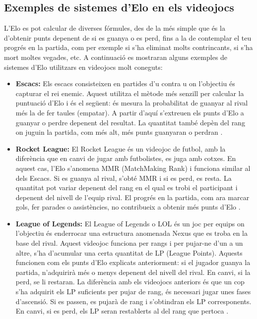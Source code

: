 \documentclass[a4paper]{article}
\begin{document}
\newpage
\subsection{Exemples de sistemes d'Elo en els videojocs}
L'Elo es pot calcular de diverses fórmules, des de la més simple que és la d'obtenir punts depenent de si es guanya o es perd, fins a la de contemplar el teu progrés en la partida, com per exemple si s'ha eliminat molts contrincants, si s'ha mort moltes vegades, etc. A continuació es mostraran alguns exemples de sistemes d'Elo utilitzars en videojocs molt coneguts:

\begin{itemize}
    \item \textbf{Escacs:} Els escacs consisteixen en partides d'u contra u on l'objectiu és capturar el rei enemic. Aquest utilitza el mètode més senzill per calcular la puntuació d'Elo i és el següent: és mesura la probabilitat de guanyar al rival més la de fer taules (empatar). A partir d'aquí s'extreuen els punts d'Elo a guanyar o perdre depenent del resultat. La quantitat també depèn del rang on juguin la partida, com més alt, més punts guanyaran o perdran \cite{wikipediaElo}.
    \item \textbf{Rocket League:} El Rocket League és un videojoc de futbol, amb la diferència que en canvi de jugar amb futbolistes, es juga amb cotxes. En aquest cas, l'Elo s'anomena MMR (MatchMaking Rank) i funciona similar al dels Escacs. Si es guanya al rival, s'obté MMR i si es perd, es resta. La quantitat pot variar depenent del rang en el qual es trobi el participant i depenent del nivell de l'equip rival. El progrés en la partida, com ara marcar gols, fer parades o assistències, no contribueix a obtenir més punts d'Elo \cite{rocketElo}.
    \item \textbf{League of Legends:} El League of Legends o LOL és un joc per equips on l'objectiu és enderrocar una estructura anomenada Nexus que es troba en la base del rival. Aquest videojoc funciona per rangs i per pujar-ne d'un a un altre, s'ha d'acumular una certa quantitat de LP (League Points). Aquests funcionen com els punts d'Elo explicats anteriorment: si el jugador guanya la partida, n'adquirirà més o menys depenent del nivell del rival. En canvi, si la perd, se li restaran. La diferència amb els videojocs anteriors és que un cop s'ha adquirit els LP suficients per pujar de rang, és necessari jugar unes fases d'ascensió. Si es passen, es pujarà de rang i s'obtindran els LP corresponents. En canvi, si es perd, els LP seran restablerts al del rang que pertoca \cite{LolElo}.

\end{itemize}
\end{document}
